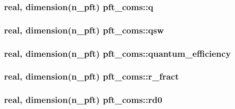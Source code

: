 \subsubsection[{q}]{\setlength{\rightskip}{0pt plus 5cm}real, dimension(n\+\_\+pft) pft\+\_\+coms\+::q}\label{namespacepft__coms_a94feb354a8416167ef0ff2690843ebcd}
\hypertarget{namespacepft__coms_a646ad26118949294d5b8007435e7d33d}{}
\subsubsection[{qsw}]{\setlength{\rightskip}{0pt plus 5cm}real, dimension(n\+\_\+pft) pft\+\_\+coms\+::qsw}\label{namespacepft__coms_a646ad26118949294d5b8007435e7d33d}
\hypertarget{namespacepft__coms_ad1cdaf379a14e627f176105d6d744edb}{}
\subsubsection[{quantum\+\_\+efficiency}]{\setlength{\rightskip}{0pt plus 5cm}real, dimension(n\+\_\+pft) pft\+\_\+coms\+::quantum\+\_\+efficiency}\label{namespacepft__coms_ad1cdaf379a14e627f176105d6d744edb}
\hypertarget{namespacepft__coms_a588d74ddc11417f923b20d000e0740aa}{}
\subsubsection[{r\+\_\+fract}]{\setlength{\rightskip}{0pt plus 5cm}real, dimension(n\+\_\+pft) pft\+\_\+coms\+::r\+\_\+fract}\label{namespacepft__coms_a588d74ddc11417f923b20d000e0740aa}
\hypertarget{namespacepft__coms_a52c1f01cac447b99de69af116c709b08}{}
\subsubsection[{rd0}]{\setlength{\rightskip}{0pt plus 5cm}real, dimension(n\+\_\+pft) pft\+\_\+coms\+::rd0}\label{namespacepft__coms_a52c1f01cac447b99de69af116c709b08}
\hypertarget{namespacepft__coms_abc5e92f122fd2ebab52069105e512fa5}{}
